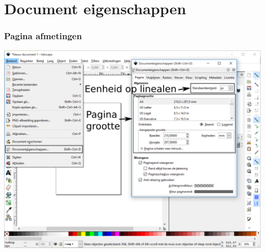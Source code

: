 \documentclass[t]{beamer}
\begin{document}
	\section{Document eigenschappen}
	\begin{frame}
		\frametitle{Pagina afmetingen}
		\begin{center}
			\includegraphics[height=0.8\textheight]{fig/inkscape_documenteigenschappen}
		\end{center}	
	\end{frame}
\end{document}
